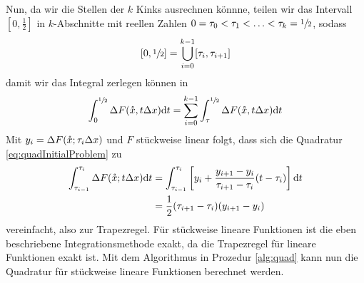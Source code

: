 Nun, da wir die Stellen der $k$ Kinks ausrechnen könnne, teilen wir das Intervall $[0,\frac{1}{2}]$ in $k$-Abschnitte mit reellen Zahlen $0=\tau_0<\tau_1<\ldots<\tau_k = \sfrac{1}{2}$,  sodass
\[
 [0,\sfrac{1}{2}] = \bigcup_{i=0}^{k-1} [\tau_i,\tau_{i+1}]
\]
damit wir das Integral zerlegen können in
\[
 \int_0^{\sfrac{1}{2}} \Delta F(\mathring{x},t\Delta x) \text{d}t = \sum_{i=0}^{k-1} \int_\tau^{\sfrac{1}{2}} \Delta F(\mathring{x},t\Delta x) \text{d}t
\]
Mit $y_i = \Delta F(\mathring{x};\tau_i \Delta x)$ und $F$ stückweise linear folgt, dass sich die Quadratur \ref{eq:quadInitialProblem} zu
\begin{equation}
\begin{aligned}
 \int_{\tau_{i-1}}^{\tau_i} \Delta F(\mathring{x};t\Delta x) \text{d}t &= \int_{\tau_{i-1}}^{\tau_i}\left[ y_i+ \frac{y_{i+1}-y_i}{\tau_{i+1}-\tau_i}(t-\tau_i) \right] \text{d}t \\
 &=\frac{1}{2}(\tau_{i+1} -\tau_i)(y_{i+1}-y_i)
 \end{aligned}
\end{equation}
vereinfacht, also zur Trapezregel. Für stückweise lineare Funktionen ist die eben beschriebene Integrationsmethode exakt, da die Trapezregel für lineare Funktionen exakt ist.
Mit dem Algorithmus in Prozedur \ref{alg:quad} kann nun die Quadratur für stückweise lineare Funktionen berechnet werden. 


